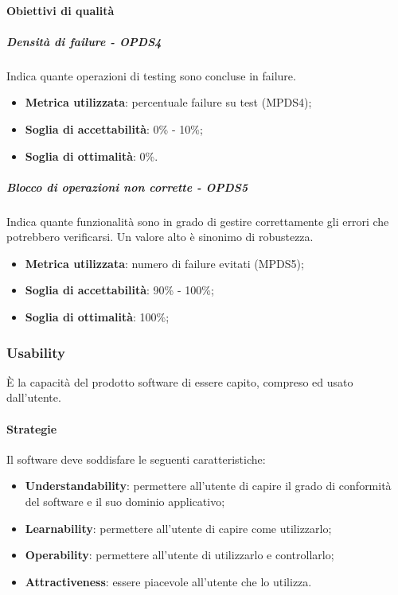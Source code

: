 \documentclass[PdQ.tex]{subfiles}
\begin{document}
			\paragraph{Obiettivi di qualità}
				\subparagraph{Densità di failure - OPDS4}
				Indica quante operazioni di testing sono concluse in failure.
				\begin{itemize}
					\item \textbf{Metrica utilizzata}: percentuale failure su test (MPDS4);
					\item \textbf{Soglia di accettabilità}: 0\% - 10\%;
					\item \textbf{Soglia di ottimalità}: 0\%.
				\end{itemize}
				
				\subparagraph{Blocco di operazioni non corrette - OPDS5}
				Indica quante funzionalità sono in grado di gestire correttamente gli errori che potrebbero verificarsi. Un valore alto è sinonimo di robustezza.
				\begin{itemize}
					\item \textbf{Metrica utilizzata}: numero di failure evitati (MPDS5);
					\item \textbf{Soglia di accettabilità}: 90\% - 100\%;
					\item \textbf{Soglia di ottimalità}: 100\%;
				\end{itemize}
		
		\subsubsection{Usability}
		È la capacità del prodotto software di essere capito, compreso ed usato dall'utente.
		
			\paragraph{Strategie}
			Il software deve soddisfare le seguenti caratteristiche:
			\begin{itemize}
				\item \textbf{Understandability}: permettere all'utente di capire il grado di conformità del software e il suo dominio applicativo;
				\item \textbf{Learnability}: permettere all'utente di capire come utilizzarlo;
				\item \textbf{Operability}: permettere all'utente di utilizzarlo e controllarlo;
				\item \textbf{Attractiveness}: essere piacevole all'utente che lo utilizza.
			\end{itemize}
			
\end{document}

